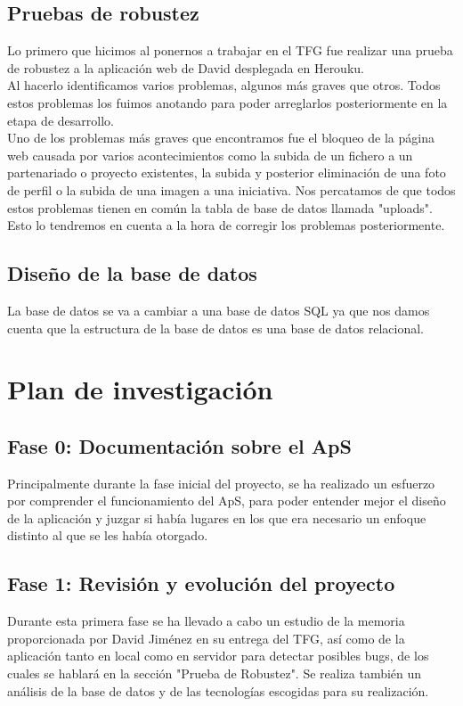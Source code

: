 \documentclass{article}
\begin{document}
\subsection{Pruebas de robustez}
Lo primero que hicimos al ponernos a trabajar en el TFG fue realizar una prueba de robustez a la aplicación web de David desplegada en Herouku.\\
Al hacerlo identificamos varios problemas, algunos más graves que otros. Todos estos problemas los fuimos anotando para poder arreglarlos posteriormente en la etapa de desarrollo.\\
Uno de los problemas más graves que encontramos fue el bloqueo de la página web causada por varios acontecimientos como la subida de un fichero a un partenariado o proyecto existentes, la subida y posterior eliminación de una foto de perfil o la subida de una imagen a una iniciativa. Nos percatamos de que todos estos problemas tienen en común la tabla de base de datos llamada "uploads". Esto lo tendremos en cuenta a la hora de corregir los problemas 
posteriormente.

\subsection{Diseño de la base de datos}
La base de datos se va a cambiar a una base de datos SQL ya que nos damos cuenta que la estructura de la base de datos es una base de datos relacional.

\section{Plan de investigación}
\subsection{Fase 0: Documentación sobre el ApS}
Principalmente durante la fase inicial del proyecto, se ha realizado un esfuerzo por comprender el funcionamiento del ApS, para poder entender mejor el diseño de la aplicación y juzgar si había lugares en los que era necesario un enfoque distinto al que se les había otorgado. 
\subsection{Fase 1: Revisión y evolución del proyecto}
Durante esta primera fase se ha llevado a cabo un estudio de la memoria proporcionada por David Jiménez en su entrega del TFG, así como de la aplicación tanto en local como en servidor para detectar posibles bugs, de los cuales se hablará en la sección "Prueba de Robustez".
Se realiza también un análisis de la base de datos y de las tecnologías escogidas para su realización.
\end{document}

